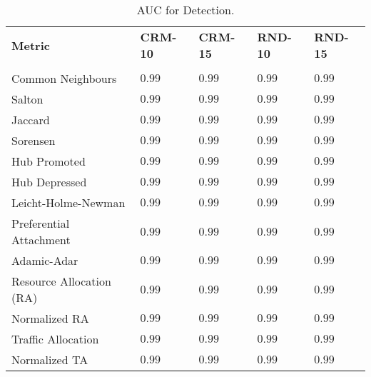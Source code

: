 \begin{table}[h]
	\centering
	\begin{tabular}{l l l l l}
	\toprule
	\textbf{Metric} & \textbf{CRM-10} & \textbf{CRM-15} & \textbf{RND-10} & \textbf{RND-15}\\\\
	\midrule
		Common Neighbours & $0.99$ & $0.99$ & $0.99$ & $0.99$ \\
		Salton  & $0.99$ & $0.99$ & $0.99$ & $0.99$ \\
		Jaccard  & $0.99$ & $0.99$ & $0.99$ & $0.99$ \\
		Sorensen   & $0.99$ & $0.99$ & $0.99$ & $0.99$ \\
		Hub Promoted  & $0.99$ & $0.99$ & $0.99$ & $0.99$ \\
		Hub Depressed  & $0.99$ & $0.99$ & $0.99$ & $0.99$ \\
		Leicht-Holme-Newman  & $0.99$ & $0.99$ & $0.99$ & $0.99$ \\
		Preferential Attachment  & $0.99$ & $0.99$ & $0.99$ & $0.99$ \\
		Adamic-Adar  & $0.99$ & $0.99$ & $0.99$ & $0.99$ \\
		Resource Allocation (RA)  & $0.99$ & $0.99$ & $0.99$ & $0.99$ \\
		Normalized RA  & $0.99$ & $0.99$ & $0.99$ & $0.99$ \\
		Traffic Allocation  & $0.99$ & $0.99$ & $0.99$ & $0.99$ \\
		Normalized TA  & $0.99$ & $0.99$ & $0.99$ & $0.99$ \\
	\bottomrule
	\end{tabular}
	\label{tab:auc-detection}
	\caption{AUC for Detection.}
\end{table}

